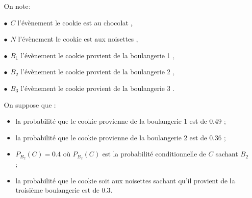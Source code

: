 \documentclass[a4paper,11pt]{article}
\begin{document}
On note:

\tabula{}$\bullet~~C$ l'évènement \og le cookie est au chocolat \fg,

\tabula{}$\bullet~~N$ l'évènement \og le cookie est aux noisettes \fg,

\tabula{}$\bullet~~B_1$ l'évènement \og le cookie provient de la boulangerie 1 \fg, 

\tabula{}$\bullet~~B_2$ l'évènement \og le cookie provient de la boulangerie 2 \fg,

\tabula{}$\bullet~~B_3$ l'évènement \og le cookie provient de la boulangerie 3 \fg.

On suppose que :

\begin{itemize}
	\item la probabilité que le cookie provienne de la boulangerie 1 est de \num{0,49} ;
	\item la probabilité que le cookie provienne de la boulangerie 2 est de \num{0,36} ;
	\item $P_{B_2}(C) = \num{0,4}$ où $P_{B_2}(C)$ est la probabilité conditionnelle de $C$ sachant $B_2$ ;
	\item la probabilité que le cookie soit aux noisettes sachant qu'il provient de la troisième boulangerie est de $\num{0,3}$.
\end{itemize}
\end{document}
